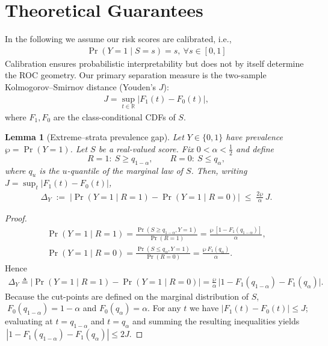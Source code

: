 \documentclass[pdflatex,sn-mathphys-num]{sn-jnl}%
\def\EQSP{3pt}
\newcommand{\mltlne}[2][\EQSP]{\begingroup\setlength\abovedisplayskip{#1}\setlength\belowdisplayskip{#1}\begin{equation}\begin{multlined} #2 \end{multlined}\end{equation}\endgroup\noindent}
\newcommand{\cgather}[2][\EQSP]{\begingroup\setlength\abovedisplayskip{#1}\setlength\belowdisplayskip{#1}\begin{gather} #2 \end{gather}\endgroup\noindent}
\theoremstyle{thmstyleone}%
\newtheorem{lemma}[theorem]{Lemma} %
\theoremstyle{thmstyletwo}%
\theoremstyle{thmstylethree}%
\begin{document}
\section{Theoretical Guarantees}
In the following we assume our risk scores are calibrated,
i.e.,
\cgather{\label{eqcalib}
  \Pr(Y=1\mid S=s)=s,\ \forall s\in[0,1]}
Calibration ensures probabilistic interpretability but does not by itself determine
the ROC geometry. Our primary separation measure is the two-sample
Kolmogorov–Smirnov distance (Youden’s \(J\)):
\cgather{
J=\sup_{t\in\mathbb{R}}\big|F_1(t)-F_0(t)\big|,
}
where \(F_1,F_0\) are the class-conditional CDFs of \(S\).
%
\begin{lemma}[Extreme–strata prevalence gap]\label{lem:prevalence-gap}
Let \(Y\in\{0,1\}\) have prevalence \(\wp=\Pr(Y=1)\).
Let \(S\) be a real-valued score. Fix \(0<\alpha<\tfrac12\) and define
\[
R=1:\ S\ge q_{1-\alpha},\qquad R=0:\ S\le q_{\alpha},
\]
where \(q_u\) is the \(u\)-quantile of the \emph{marginal} law of \(S\).
Then, writing \(J=\sup_t|F_1(t)-F_0(t)|\),
\cgather{
\Delta_Y\;:=\;\big|\Pr(Y=1\mid R=1)-\Pr(Y=1\mid R=0)\big|
\;\le\;\frac{2\wp}{\alpha}\,J.
\tag{KS bound}
}
\end{lemma}
%
\begin{proof}
\cgather{
\Pr(Y=1\mid R=1)
  =\frac{\Pr(S\ge q_{1-\alpha},Y=1)}{\Pr(R=1)}
  =\frac{\wp\,[1-F_1(q_{1-\alpha})]}{\alpha},\\[6pt]
\Pr(Y=1\mid R=0)
  =\frac{\Pr(S\le q_{\alpha},Y=1)}{\Pr(R=0)}
  =\frac{\wp\,F_1(q_{\alpha})}{\alpha}.
}
Hence
\mltlne{
\Delta_Y
\triangleq\bigl|\Pr(Y=1\mid R=1)-\Pr(Y=1\mid R=0)\bigr| =\frac{\wp}{\alpha}\,
    \bigl|1-F_1(q_{1-\alpha})-F_1(q_{\alpha})\bigr|.
}%
Because the cut-points are defined on the marginal distribution of \(S\),
\(\;F_0(q_{1-\alpha})=1-\alpha\) and \(F_0(q_{\alpha})=\alpha\).
For any \(t\) we have \(\lvert F_1(t)-F_0(t)\rvert\le J\); evaluating at
\(t=q_{1-\alpha}\) and \(t=q_{\alpha}\) and summing the resulting
inequalities yields
\(\,|1-F_1(q_{1-\alpha})-F_1(q_{\alpha})|\le2J\).
\end{proof}
\end{document}
